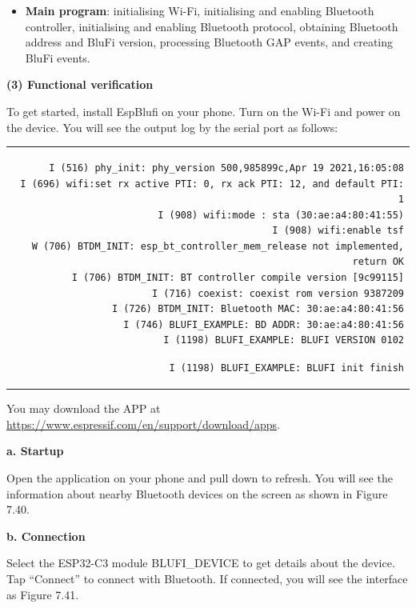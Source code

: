 \documentclass[a4paper,12pt,openany]{book}
\renewcommand{\ttfamily}{\fontfamily{pcr}\selectfont}
\renewcommand{\arraystretch}{1}
\newenvironment{codebloc}{ %
    \ttfamily\footnotesize
    \renewcommand{\arraystretch}{1}
}
\newcommand{\note}[2][NOTE]{ %
\vspace{6pt}
\begin{tabular}{b{\textwidth}}
\hline
\fontfamily{phv}\selectfont \textbf{#1}\\
\leftskip 1em #2\\
\hline
\end{tabular}
}
\begin{document}
\begin{itemize}[leftmargin=1.5em]
    \item \textbf{Main program}: initialising Wi-Fi, initialising and enabling Bluetooth controller, initialising and enabling Bluetooth protocol, obtaining Bluetooth address and BluFi version, processing Bluetooth GAP events, and creating BluFi events.
\end{itemize}

\textbf{(3) Functional verification}

To get started, install EspBlufi on your phone. Turn on the Wi-Fi and power on the device. You will see the output log by the serial port as follows:

\begin{codebloc}
\fontsize{10pt}{10pt}\selectfont
\begin{tabular}{d}
\vspace{2pt}
\begin{verbatim}
I (516) phy_init: phy_version 500,985899c,Apr 19 2021,16:05:08
I (696) wifi:set rx active PTI: 0, rx ack PTI: 12, and default PTI: 1
I (908) wifi:mode : sta (30:ae:a4:80:41:55)
I (908) wifi:enable tsf
W (706) BTDM_INIT: esp_bt_controller_mem_release not implemented, return OK
I (706) BTDM_INIT: BT controller compile version [9c99115]
I (716) coexist: coexist rom version 9387209
I (726) BTDM_INIT: Bluetooth MAC: 30:ae:a4:80:41:56
I (746) BLUFI_EXAMPLE: BD ADDR: 30:ae:a4:80:41:56
I (1198) BLUFI_EXAMPLE: BLUFI VERSION 0102
\end{verbatim}
\verb|I (1198) BLUFI_EXAMPLE: BLUFI init finish|
\end{tabular}
\end{codebloc}

\note{You may download the APP at \url{https://www.espressif.com/en/support/download/apps}.}

\textbf{a. Startup}

Open the application on your phone and pull down to refresh. You will see the information about nearby Bluetooth devices on the screen as shown in Figure 7.40.

\textbf{b. Connection}

Select the ESP32-C3 module BLUFI\_DEVICE to get details about the device. Tap “Connect” to connect with Bluetooth. If connected, you will see the interface as Figure 7.41.
\end{document}
